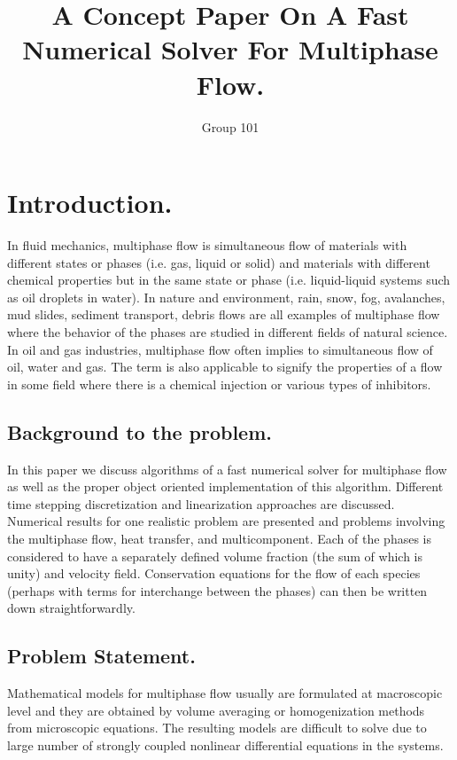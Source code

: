 \documentclass[a4paper,12pt]{article}
\begin{document}
\title{A Concept Paper On A Fast Numerical Solver For Multiphase Flow.}
\author{Group 101}
\maketitle
\section{Introduction.}
In fluid mechanics, multiphase flow is simultaneous flow of materials with different states or phases (i.e. gas, liquid or solid) and materials with different chemical properties but in the same state or phase (i.e. liquid-liquid systems such as oil droplets in water).
\newline
\newline
In nature and environment, rain, snow, fog, avalanches, mud slides, sediment transport, debris flows are all examples of multiphase flow where the behavior of the phases are studied in different fields of natural science.
\newline
\newline
In oil and gas industries, multiphase flow often implies to simultaneous flow of oil, water and gas. The term is also applicable to signify the properties of a flow in some field where there is a chemical injection or various types of inhibitors.
\subsection{Background to the problem.}
In this paper we discuss algorithms of a fast numerical solver for multiphase flow as well as the proper object oriented implementation of this algorithm. Different time stepping discretization and linearization approaches are discussed. 
\newline 
\newline
Numerical results for one realistic problem are presented and problems involving the multiphase flow, heat transfer, and multicomponent.
Each of the phases is considered to have a separately defined volume fraction (the sum of which is unity) and velocity field. Conservation equations for the flow of each species (perhaps with terms for interchange between the phases) can then be written down straightforwardly.
\subsection{Problem Statement.}
Mathematical models for multiphase flow usually are formulated at macroscopic level and they are obtained by volume averaging or homogenization methods from microscopic equations.
\newline The resulting models are difficult to solve due to large number of strongly coupled nonlinear differential equations in the systems.
\newline
\end{document}
